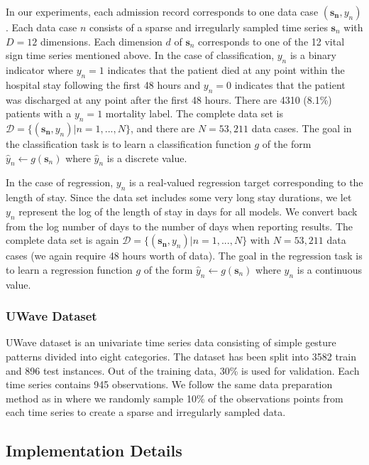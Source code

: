 \documentclass{article} \usepackage{iclr2019_conference,times}
\newcommand{\mbf}[1]{\mathbf{#1}}
\begin{document}
In our experiments, each admission record corresponds to one data case $(\mbf{s_n},y_n)$. Each data case $n$ consists of a sparse and irregularly sampled time series $\mbf{s}_n$ with $D=12$ dimensions. Each dimension $d$ 
of $\mbf{s}_n$ corresponds to one of the 12 vital sign time series mentioned above. In the case of classification, $y_n$ is a binary indicator where $y_n=1$ indicates that the patient died at any point within the hospital stay following the first 48 hours and $y_n=0$ indicates that the patient was discharged at any point after the first 48 hours. There are 4310 (8.1\%) patients with a $y_n=1$ mortality label. The complete data set is $\mathcal{D}=\{(\mbf{s_n},y_n)|n=1,...,N\}$, and there
are $N=53,211$ data cases. The goal in the classification task is to learn a classification function $g$ of the
form $\hat{y}_n \leftarrow g(\mbf{s}_n)$ where $\hat{y}_n$ is a discrete value.

In the case of regression, $y_n$ is a real-valued regression target corresponding to the length of stay. Since the
data set includes some very long stay durations, we let $y_n$ represent the log of the length of stay in days for 
all models. We convert back from the log number of days to the number of days when reporting results.
The complete data set is again $\mathcal{D}=\{(\mbf{s_n},y_n)|n=1,...,N\}$ with
$N=53,211$ data cases (we again require 48 hours worth of data). The goal in the regression task is to learn a regression function $g$ of the form $\hat{y}_n \leftarrow g(\mbf{s}_n)$ where $\hat{y}_n$ is a continuous value.

\subsubsection{UWave Dataset}
UWave dataset is an univariate time series data consisting of simple gesture patterns divided into eight categories. The dataset has been split into 3582  train and 896 test instances. Out of the training data, 30\% is used for validation. Each time series contains 945 observations. We follow the same data preparation method as in \cite{li2016scalable} where we randomly sample 10\% of the observations points from each time series to create a sparse and irregularly sampled data.

\subsection{Implementation Details}
\label{implementation}
\end{document}
